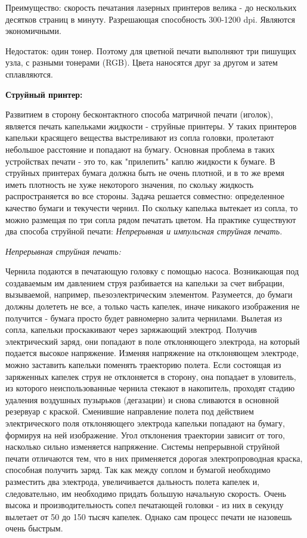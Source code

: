 \documentclass[unicode, 12pt, a4paper, oneside]{article}
\begin{document}
Преимущество: скорость печатания лазерных принтеров велика - до нескольких десятков страниц в минуту. Разрешающая способность 300-1200 dpi. Являются экономичными.

Недостаток: один тонер. Поэтому для цветной печати выполняют три пишущих узла, с разными тонерами (RGB). Цвета наносятся друг за другом  и затем сплавляются. 

{\bf Струйный принтер:}

Развитием в сторону бесконтактного способа матричной печати (иголок), является печать капельками жидкости - струйные принтеры. У таких принтеров капельки красящего вещества выстреливают из сопла головки, пролетают небольшое расстояние и попадают на бумагу. Основная проблема в таких устройствах печати - это то, как "прилепить" каплю жидкости к бумаге. В струйных принтерах бумага должна быть не очень плотной, и в то же время иметь плотность не хуже некоторого значения, по скольку жидкость распространяется во все стороны. Задача решается совместно: определенное качество бумаги и текучести чернил. По скольку капелька вытекает из сопла, то можно размещая по три сопла рядом печатать цветом. На практике существуют два способа струйной печати: {\sl Непрерывная и импульсная струйная печать.}

{\sl Непрерывная струйная  печать:}

Чернила подаются в печатающую головку с помощью насоса. Возникающая под создаваемым им давлением струя разбивается на капельки за счет вибрации, вызываемой, например, пьезоэлектрическим элементом. Разумеется, до бумаги должны долететь не все, а только часть капелек, иначе никакого изображения не получится - бумага просто будет равномерно залита чернилами.
Вылетая из сопла, капельки проскакивают через заряжающий электрод. Получив электрический заряд, они попадают в поле отклоняющего электрода, на который подается высокое напряжение. Изменяя напряжение на отклоняющем электроде, можно заставить капельки поменять траекторию полета. Если состоящая из заряженных капелек струя не отклоняется в сторону, она попадает в уловитель, из которого неиспользованные чернила стекают в накопитель, проходят стадию удаления воздушных пузырьков (дегазации) и снова сливаются в основной резервуар с краской.
Сменившие направление полета под действием электрического поля отклоняющего электрода капельки попадают на бумагу, формируя на ней изображение. Угол отклонения траектории зависит от того, насколько сильно изменяется напряжение.
Системы непрерывной струйной печати отличаются тем, что в них применяется дорогая электропроводная краска, способная получить заряд. Так как между соплом и бумагой необходимо разместить два электрода, увеличивается дальность полета капелек и, следовательно, им необходимо придать большую начальную скорость. Очень высока и производительность сопел печатающей головки - из них в секунду вылетает от 50 до 150 тысяч капелек. Однако сам процесс печати не назовешь очень быстрым.
\end{document}
